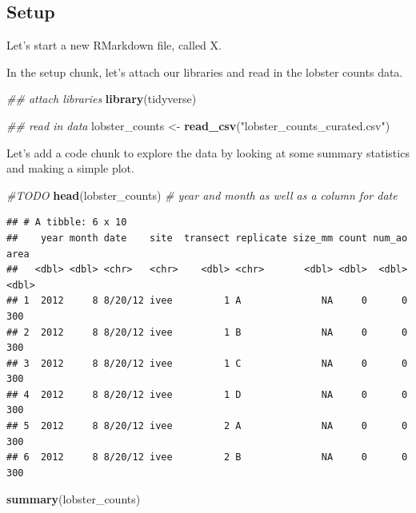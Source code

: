 \documentclass[]{book}
\newenvironment{Shaded}{\begin{snugshade}}{\end{snugshade}}
\newcommand{\CommentTok}[1]{\textcolor[rgb]{0.56,0.35,0.01}{\textit{#1}}}
\newcommand{\KeywordTok}[1]{\textcolor[rgb]{0.13,0.29,0.53}{\textbf{#1}}}
\newcommand{\NormalTok}[1]{#1}
\newcommand{\StringTok}[1]{\textcolor[rgb]{0.31,0.60,0.02}{#1}}
\begin{document}
\hypertarget{setup}{%
\subsection{Setup}\label{setup}}

Let's start a new RMarkdown file, called X.

In the setup chunk, let's attach our libraries and read in the lobster counts data.

\begin{Shaded}
\begin{Highlighting}[]
\CommentTok{## attach libraries}
\KeywordTok{library}\NormalTok{(tidyverse)}

\CommentTok{## read in data}
\NormalTok{lobster_counts <-}\StringTok{ }\KeywordTok{read_csv}\NormalTok{(}\StringTok{"lobster_counts_curated.csv"}\NormalTok{)}
\end{Highlighting}
\end{Shaded}

Let's add a code chunk to explore the data by looking at some summary statistics and making a simple plot.

\begin{Shaded}
\begin{Highlighting}[]
\CommentTok{#TODO}
\KeywordTok{head}\NormalTok{(lobster_counts) }\CommentTok{# year and month as well as a column for date}
\end{Highlighting}
\end{Shaded}

\begin{verbatim}
## # A tibble: 6 x 10
##    year month date    site  transect replicate size_mm count num_ao  area
##   <dbl> <dbl> <chr>   <chr>    <dbl> <chr>       <dbl> <dbl>  <dbl> <dbl>
## 1  2012     8 8/20/12 ivee         1 A              NA     0      0   300
## 2  2012     8 8/20/12 ivee         1 B              NA     0      0   300
## 3  2012     8 8/20/12 ivee         1 C              NA     0      0   300
## 4  2012     8 8/20/12 ivee         1 D              NA     0      0   300
## 5  2012     8 8/20/12 ivee         2 A              NA     0      0   300
## 6  2012     8 8/20/12 ivee         2 B              NA     0      0   300
\end{verbatim}

\begin{Shaded}
\begin{Highlighting}[]
\KeywordTok{summary}\NormalTok{(lobster_counts)}
\end{Highlighting}
\end{Shaded}
\end{document}
